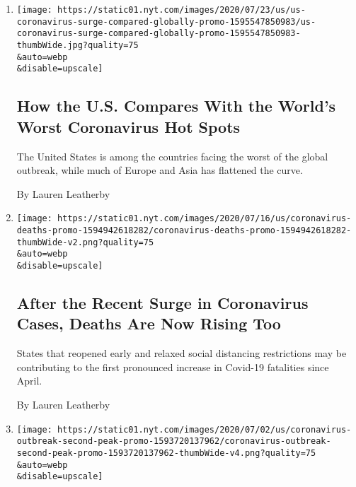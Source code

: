 \begin{enumerate}
\def\labelenumi{\arabic{enumi}.}
\item
  \href{/interactive/2020/07/23/us/coronavirus-hotspots-countries.html}{}

  \texttt{[image: https://static01.nyt.com/images/2020/07/23/us/us-coronavirus-surge-compared-globally-promo-1595547850983/us-coronavirus-surge-compared-globally-promo-1595547850983-thumbWide.jpg?quality=75\\\&auto=webp\\\&disable=upscale]}

  \hypertarget{how-the-us-compares-with-the-worlds-worst-coronavirus-hot-spots}{%
  \subsection{How the U.S. Compares With the World's Worst Coronavirus
  Hot
  Spots}\label{how-the-us-compares-with-the-worlds-worst-coronavirus-hot-spots}}

  The United States is among the countries facing the worst of the
  global outbreak, while much of Europe and Asia has flattened the
  curve.

  By Lauren Leatherby
\item
  \href{/interactive/2020/07/17/us/coronavirus-deaths.html}{}

  \texttt{[image: https://static01.nyt.com/images/2020/07/16/us/coronavirus-deaths-promo-1594942618282/coronavirus-deaths-promo-1594942618282-thumbWide-v2.png?quality=75\\\&auto=webp\\\&disable=upscale]}

  \hypertarget{after-the-recent-surge-in-coronavirus-cases-deaths-are-now-rising-too}{%
  \subsection{After the Recent Surge in Coronavirus Cases, Deaths Are
  Now Rising
  Too}\label{after-the-recent-surge-in-coronavirus-cases-deaths-are-now-rising-too}}

  States that reopened early and relaxed social distancing restrictions
  may be contributing to the first pronounced increase in Covid-19
  fatalities since April.

  By Lauren Leatherby
\item
  \href{/interactive/2020/07/02/us/coronavirus-cases-increase.html}{}

  \texttt{[image: https://static01.nyt.com/images/2020/07/02/us/coronavirus-outbreak-second-peak-promo-1593720137962/coronavirus-outbreak-second-peak-promo-1593720137962-thumbWide-v4.png?quality=75\\\&auto=webp\\\&disable=upscale]}


\end{enumerate}
